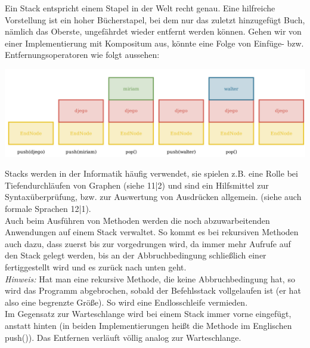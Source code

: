 \documentclass{article}
\begin{document}
Ein Stack entspricht einem Stapel in der  Welt recht genau. Eine hilfreiche Vorstellung ist ein hoher Bücherstapel, bei dem nur das zuletzt hinzugefügt Buch, nämlich das Oberste, ungefährdet wieder entfernt werden können. Gehen wir von einer Implementierung mit Kompositum aus, könnte eine Folge von Einfüge- bzw. Entfernungsoperatoren wie folgt aussehen: 
\begin{center}
    \includegraphics[scale=0.25]{../../media/stack.png}
\end{center}
Stacks werden in der Informatik häufig verwendet, sie spielen z.B. eine Rolle bei Tiefendurchläufen von Graphen (siehe 11|2) und sind ein Hilfsmittel zur Syntaxüberprüfung, bzw. zur Auswertung von Ausdrücken allgemein. (siehe auch formale Sprachen 12|1). \\
Auch beim Ausführen von Methoden werden die noch abzuwarbeitenden Anwendungen auf einem Stack verwaltet. So kommt es bei rekursiven Methoden auch dazu, dass zuerst bis zur  vorgedrungen wird, da immer mehr Aufrufe auf den Stack gelegt werden, bis an der Abbruchbedingung schließlich einer fertiggestellt wird und es zurück nach unten geht. \\
\textit{Hinweis:} Hat man eine rekursive Methode, die keine Abbruchbedingung hat, so wird das Programm abgebrochen, sobald der Befehlsstack vollgelaufen ist (er hat also eine begrenzte Größe). So wird eine Endlosschleife vermieden. \\
Im Gegensatz zur Warteschlange wird bei einem Stack immer vorne eingefügt, anstatt hinten (in beiden Implementierungen heißt die Methode im Englischen push()). Das Entfernen verläuft völlig analog zur Warteschlange.
\end{document}
